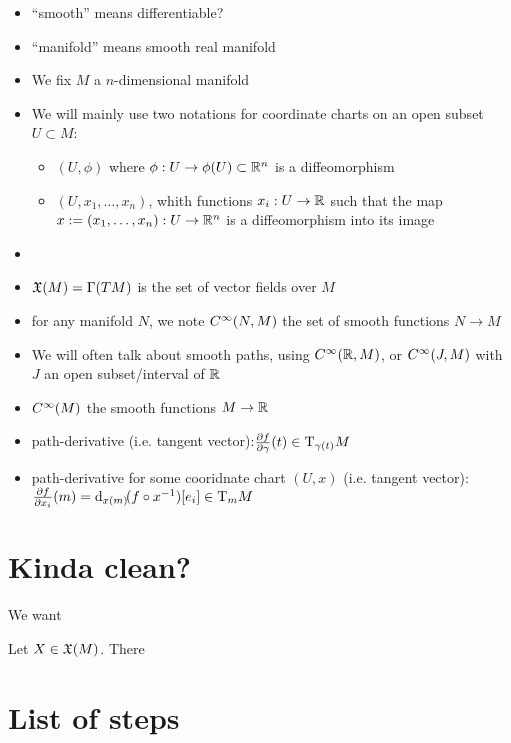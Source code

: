 	\begin{itemize}
		\item ``smooth'' means differentiable?
		\item ``manifold'' means smooth real manifold
		\item We fix $M$ a $n$-dimensional manifold
		\item We will mainly use two notations for coordinate charts on an open subset $U \subset M$:
			\begin{itemize}
				\item $(U, \phi)$ where $\phi: U \to \phi(U) \subset \mathbb{R}^n$ is a diffeomorphism
				\item $(U, x_1, \ldots, x_n)$, whith functions $x_i: U \to \mathbb{R}$ such that the map $x := (x_1, \ldots, x_n) : U \to \mathbb{R}^n$ is a diffeomorphism into its image
			\end{itemize}
		\item {}
		\item $\mathfrak{X}(M) = \Gamma(TM)$ is the set of vector fields over $M$
		\item for any manifold $N$, we note $C^\infty(N, M)$ the set of smooth functions $N \to M$ 
		\item We will often talk about smooth paths, using $C^\infty(\mathbb{R}, M)$, or $C^\infty(J, M)$ with $J$ an open subset/interval of $\mathbb{R}$
		\item $C^\infty(M)$ the smooth functions $M \to \mathbb{R}$
		\item path-derivative (i.e. tangent vector):$\frac{\partial{f}}{\partial{\gamma}}(t) \in \mathrm{T}_{\gamma(t)}{M}$
		\item path-derivative for some cooridnate chart $(U,x)$ (i.e. tangent vector): $\frac{\partial{f}}{\partial{x_i}}(m) = \di[x(m)](f \circ x^{-1})[e_i] \in \T_m{M}$
	\end{itemize}

\section{Kinda clean?}

	We want

	\begin{lemma}
		Let $X \in \mathfrak{X}(M)$. There 
	\end{lemma}

\section{List of steps}
	
